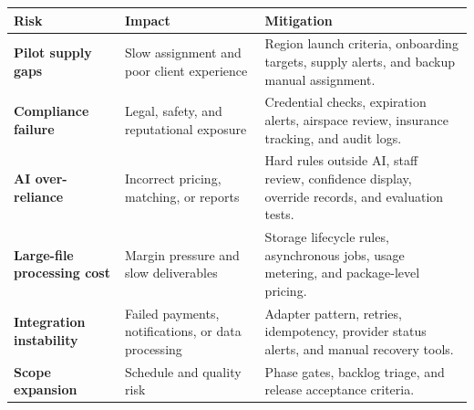 \documentclass[11pt,a4paper]{article}
\begin{document}
\begin{longtable}{>{\bfseries}p{}p{}p{}}
\toprule
Risk & Impact & Mitigation \\
\midrule
Pilot supply gaps & Slow assignment and poor client experience & Region launch criteria, onboarding targets, supply alerts, and backup manual assignment. \\
Compliance failure & Legal, safety, and reputational exposure & Credential checks, expiration alerts, airspace review, insurance tracking, and audit logs. \\
AI over-reliance & Incorrect pricing, matching, or reports & Hard rules outside AI, staff review, confidence display, override records, and evaluation tests. \\
Large-file processing cost & Margin pressure and slow deliverables & Storage lifecycle rules, asynchronous jobs, usage metering, and package-level pricing. \\
Integration instability & Failed payments, notifications, or data processing & Adapter pattern, retries, idempotency, provider status alerts, and manual recovery tools. \\
Scope expansion & Schedule and quality risk & Phase gates, backlog triage, and release acceptance criteria. \\
\bottomrule
\end{longtable}
\end{document}
